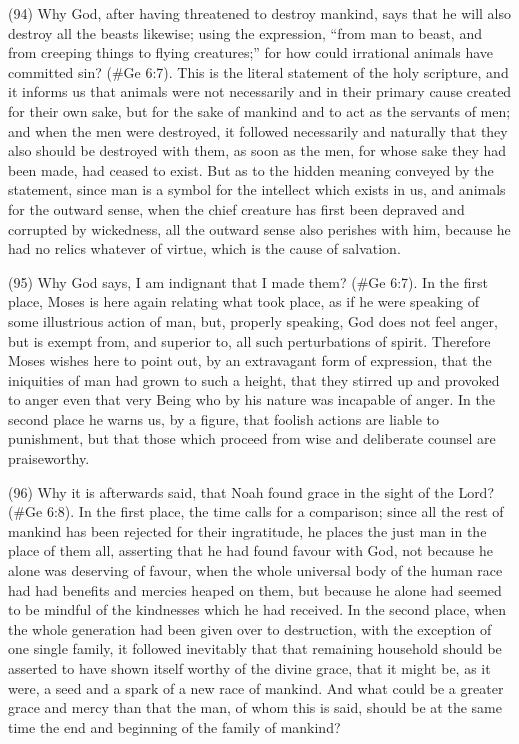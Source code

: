 (94) Why God, after having threatened to destroy mankind, says that he will also destroy all the
beasts likewise; using the expression, ``from man to beast, and from creeping things to flying
creatures;'' for how could irrational animals have committed sin? (\#Ge 6:7). This is the literal
statement of the holy scripture, and it informs us that animals were not necessarily and in their
primary cause created for their own sake, but for the sake of mankind and to act as the servants
of men; and when the men were destroyed, it followed necessarily and naturally that they also
should be destroyed with them, as soon as the men, for whose sake they had been made, had
ceased to exist. But as to the hidden meaning conveyed by the statement, since man is a symbol
for the intellect which exists in us, and animals for the outward sense, when the chief creature has
first been depraved and corrupted by wickedness, all the outward sense also perishes with him,
because he had no relics whatever of virtue, which is the cause of salvation.

(95) Why God says, I am indignant that I made them? (\#Ge 6:7). In the first place, Moses is
here again relating what took place, as if he were speaking of some illustrious action of man, but,
properly speaking, God does not feel anger, but is exempt from, and superior to, all such
perturbations of spirit. Therefore Moses wishes here to point out, by an extravagant form of
expression, that the iniquities of man had grown to such a height, that they stirred up and provoked
to anger even that very Being who by his nature was incapable of anger. In the second place he
warns us, by a figure, that foolish actions are liable to punishment, but that those which proceed
from wise and deliberate counsel are praiseworthy.

(96) Why it is afterwards said, that Noah found grace in the sight of the Lord? (\#Ge 6:8). In the
first place, the time calls for a comparison; since all the rest of mankind has been rejected for their
ingratitude, he places the just man in the place of them all, asserting that he had found favour with
God, not because he alone was deserving of favour, when the whole universal body of the human
race had had benefits and mercies heaped on them, but because he alone had seemed to be
mindful of the kindnesses which he had received. In the second place, when the whole generation
had been given over to destruction, with the exception of one single family, it followed inevitably that
that remaining household should be asserted to have shown itself worthy of the divine grace, that it
might be, as it were, a seed and a spark of a new race of mankind. And what could be a greater
grace and mercy than that the man, of whom this is said, should be at the same time the end and
beginning of the family of mankind?


